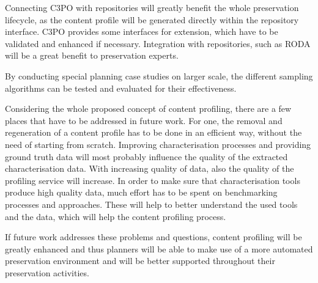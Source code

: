 Connecting C3PO with repositories will greatly benefit the whole preservation lifecycle, as the content profile will be generated directly within the repository interface. C3PO provides some interfaces for extension, which have to be validated and enhanced if necessary. Integration with repositories, such as RODA will be a great benefit to preservation experts.

By conducting special planning case studies on larger scale, the different sampling algorithms can be tested and evaluated for their effectiveness.

Considering the whole proposed concept of content profiling, there are a few places that have to be addressed in future work. For one, the removal and regeneration of a content profile has to be done in an efficient way, without the need of starting from scratch. Improving characterisation processes and providing ground truth data will most probably influence the quality of the extracted characterisation data. With increasing quality of data, also the quality of the profiling service will increase. In order to make sure that characterisation tools produce high quality data, much effort has to be spent on benchmarking processes and approaches. These will help to better understand the used tools and the data, which will help the content profiling process. 

If future work addresses these problems and questions, content profiling will be greatly enhanced and thus planners will be able to make use of a more automated preservation environment and will be better supported throughout their preservation activities.	
